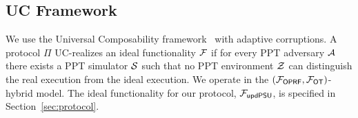 \begin{center}
\label{fig:f-psu}
\end{center}


\subsection{UC Framework}

We use the Universal Composability framework~\cite{Can01} with adaptive
corruptions. A protocol $\Pi$ UC-realizes an ideal functionality $\mathcal{F}$ if for
every PPT adversary $\mathcal{A}$ there exists a PPT simulator $\mathcal{S}$ such that no PPT
environment $\mathcal{Z}$ can distinguish the real execution from the ideal execution.
We operate in the $(\mathcal{F}_{\mathsf{OPRF}}, \mathcal{F}_{\mathsf{OT}})$-hybrid model.
The ideal functionality for our protocol, $\mathcal{F}_{\mathsf{updPSU}}$, is specified
in Section~\ref{sec:protocol}.

